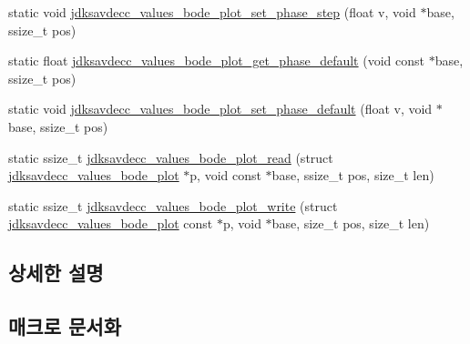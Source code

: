 \begin{DoxyCompactItemize}
\item 
static void \hyperlink{group__values__bode__plot_gae995eadca352cec734a9195b33693360}{jdksavdecc\+\_\+values\+\_\+bode\+\_\+plot\+\_\+set\+\_\+phase\+\_\+step} (float v, void $\ast$base, ssize\+\_\+t pos)
\item 
static float \hyperlink{group__values__bode__plot_gabbaa61ac921fd5ddd78901c8c5364224}{jdksavdecc\+\_\+values\+\_\+bode\+\_\+plot\+\_\+get\+\_\+phase\+\_\+default} (void const $\ast$base, ssize\+\_\+t pos)
\item 
static void \hyperlink{group__values__bode__plot_gada6eff3f3ca8ac20625390dcbd2f76d1}{jdksavdecc\+\_\+values\+\_\+bode\+\_\+plot\+\_\+set\+\_\+phase\+\_\+default} (float v, void $\ast$base, ssize\+\_\+t pos)
\item 
static ssize\+\_\+t \hyperlink{group__values__bode__plot_gad97b2e8a52f780f165d31bb2b133881a}{jdksavdecc\+\_\+values\+\_\+bode\+\_\+plot\+\_\+read} (struct \hyperlink{structjdksavdecc__values__bode__plot}{jdksavdecc\+\_\+values\+\_\+bode\+\_\+plot} $\ast$p, void const $\ast$base, ssize\+\_\+t pos, size\+\_\+t len)
\item 
static ssize\+\_\+t \hyperlink{group__values__bode__plot_ga754c78e43703858da2e5fc0424166753}{jdksavdecc\+\_\+values\+\_\+bode\+\_\+plot\+\_\+write} (struct \hyperlink{structjdksavdecc__values__bode__plot}{jdksavdecc\+\_\+values\+\_\+bode\+\_\+plot} const $\ast$p, void $\ast$base, size\+\_\+t pos, size\+\_\+t len)
\end{DoxyCompactItemize}


\subsection{상세한 설명}


\subsection{매크로 문서화}
